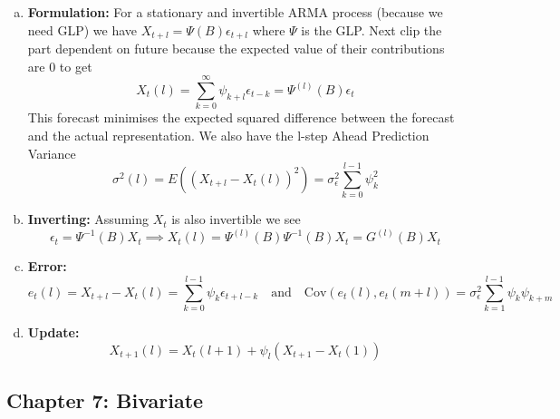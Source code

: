 \documentclass{article}
\begin{document}
\begin{enumerate} [a.]
    \item \textbf{Formulation:} For a stationary and invertible ARMA process (because we need GLP) we have \(X_{t+l} = \Psi(B)\epsilon_{t+l}\) where \(\Psi\) is the GLP. Next clip the part dependent on future because the expected value of their contributions are 0 to get
    \[
    X_t(l) = \sum_{k=0}^{\infty} \psi_{k+l}\epsilon_{t-k} = \Psi^{(l)}(B)\epsilon_t
    \]
    This forecast minimises the expected squared difference between the forecast and the actual representation. We also have the l-step Ahead Prediction Variance
    \[
    \sigma^2(l)= E((X_{t+l}-X_t(l))^2) = \sigma_\epsilon^2\sum_{k=0}^{l-1} \psi_k^2
    \]
    \item \textbf{Inverting:} Assuming \(X_t\) is also invertible we see
    \[
    \epsilon_t = \Psi^{-1}(B)X_t \implies X_t(l) = \Psi^{(l)}(B)\Psi^{-1}(B)X_t = G^{(l)}(B)X_t
    \]
    \item \textbf{Error:}
    \[
    e_t(l) = X_{t+l} - X_t(l) = \sum_{k=0}^{l-1} \psi_{k}\epsilon_{t+l-k} \quad \text{and} \quad \text{Cov}(e_t(l), e_t(m+l))=\sigma_\epsilon^2\sum_{k=1}^{l-1}\psi_k\psi_{k+m}
    \]
    \item \textbf{Update:}
    \[
    X_{t+1} (l)= X_t(l+1)+\psi_l(X_{t+1} - X_t(1))
    \]
\end{enumerate}

\subsection*{Chapter 7: Bivariate}
\end{document}
